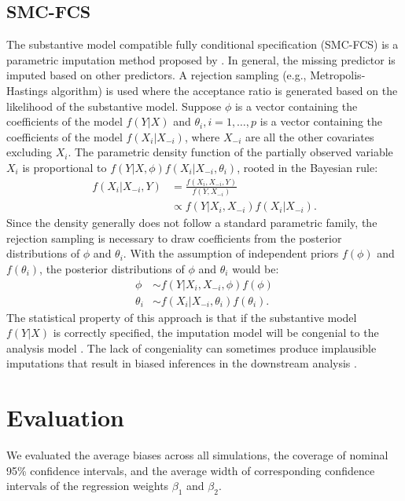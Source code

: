 	\subsection{SMC-FCS} 
	The substantive model compatible fully conditional specification (SMC-FCS) is a parametric imputation method proposed by \citet{bartlett2015multiple}. In general, the missing predictor is imputed based on other predictors. A rejection sampling (e.g., Metropolis-Hastings algorithm) is used where the acceptance ratio is generated based on the likelihood of the substantive model. Suppose $\phi$ is a vector containing the coefficients of the model $f(Y|X)$ and $\theta_{i}, i = 1, \dots, p$ is a vector containing the coefficients of the model $f(X_{i}|X_{-i})$, where $X_{-i}$ are all the other covariates excluding $X_{i}$. The parametric density function of the partially observed variable $X_{i}$ is proportional to $f(Y|X, \phi)f(X_{i}|X_{-i}, \theta_{i})$, rooted in the Bayesian rule:
	\begin{equation}
		\begin{array}{ll}
			f(X_{i}|X_{-i}, Y) &= \frac{f(X_{i}, X_{-i}, Y)}{f(Y, X_{-i})}\\
			&\propto f(Y|X_{i}, X_{-i})f(X_{i}|X_{-i}).
		\end{array} 
	\end{equation}
	Since the density generally does not follow a standard parametric family, the rejection sampling is necessary to draw coefficients from the posterior distributions of $\phi$ and $\theta_{i}$. With the assumption of independent priors $f(\phi)$ and $f(\theta_{i})$, the posterior distributions of $\phi$ and $\theta_{i}$ would be:
	\begin{equation}
		\begin{array}{ll}
			\phi &\sim f(Y|X_{i}, X_{-i}, \phi)f(\phi)\\
			\theta_{i} &\sim f(X_{i}|X_{-i}, \theta_{i})f(\theta_{i}).
		\end{array}
	\end{equation}
	The statistical property of this approach is that if the substantive model $f(Y|X)$ is correctly specified, the imputation model will be congenial to the analysis model \citep{meng1994multiple}. The lack of congeniality can sometimes produce implausible imputations that result in biased inferences in the downstream analysis \citep{robins2000inference}. 
	\section{Evaluation}
	We evaluated the average biases across all simulations, the coverage of nominal 95\% confidence intervals, and the average width of corresponding confidence intervals of the regression weights $\beta_{1}$ and $\beta_{2}$. 
